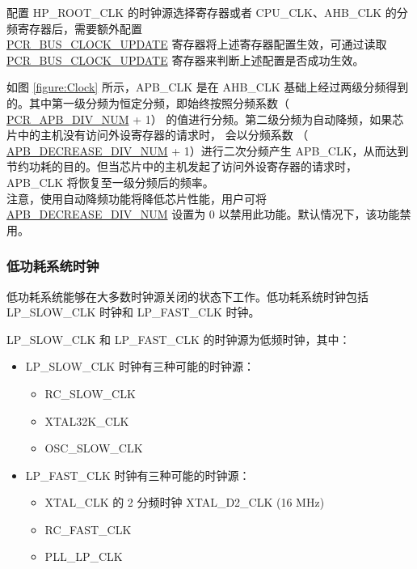 \documentclass[main\_\_CN.tex]{subfiles}
\begin{document}
\begin{tiplisting}
配置 HP\_ROOT\_CLK 的时钟源选择寄存器或者 CPU\_CLK、AHB\_CLK 的分频寄存器后，需要额外配置 \\\hyperref[fielddesc:PCRBUSCLOCKUPDATE]{PCR\_BUS\_CLOCK\_UPDATE} 寄存器将上述寄存器配置生效，可通过读取 \hyperref[fielddesc:PCRBUSCLOCKUPDATE]{PCR\_BUS\_CLOCK\_UPDATE} 寄存器来判断上述配置是否成功生效。
\end{tiplisting}


如图 \ref{figure:Clock} 所示，APB\_CLK 是在 AHB\_CLK 基础上经过两级分频得到的。其中第一级分频为恒定分频，即始终按照分频系数（ \hyperref[fielddesc:PCRAPBDIVNUM]{PCR\_APB\_DIV\_NUM} + 1） 的值进行分频。第二级分频为自动降频，如果芯片中的主机没有访问外设寄存器的请求时， 会以分频系数 （ \hyperref[fielddesc:PCRAPBDECREASEDIVNUM]{APB\_DECREASE\_DIV\_NUM} + 1）进行二次分频产生 APB\_CLK，从而达到节约功耗的目的。但当芯片中的主机发起了访问外设寄存器的请求时，APB\_CLK 将恢复至一级分频后的频率。\\
注意，使用自动降频功能将降低芯片性能，用户可将 \hyperref[fielddesc:PCRAPBDECREASEDIVNUM]{APB\_DECREASE\_DIV\_NUM} 设置为 0 以禁用此功能。默认情况下，该功能禁用。



\subsubsection{低功耗系统时钟}

低功耗系统能够在大多数时钟源关闭的状态下工作。低功耗系统时钟包括 LP\_SLOW\_CLK 时钟和 LP\_FAST\_CLK 时钟。

LP\_SLOW\_CLK 和 LP\_FAST\_CLK 的时钟源为低频时钟，其中：
\begin{itemize}
    \item LP\_SLOW\_CLK 时钟有三种可能的时钟源：
    \begin{itemize}
        \item RC\_SLOW\_CLK
        \item XTAL32K\_CLK
        \item OSC\_SLOW\_CLK
    \end{itemize}
    \item LP\_FAST\_CLK 时钟有三种可能的时钟源：
    \begin{itemize}
        \item XTAL\_CLK 的 2 分频时钟 XTAL\_D2\_CLK (16 MHz)
        \item RC\_FAST\_CLK
        \item PLL\_LP\_CLK
    \end{itemize}
\end{itemize}
\end{document}
